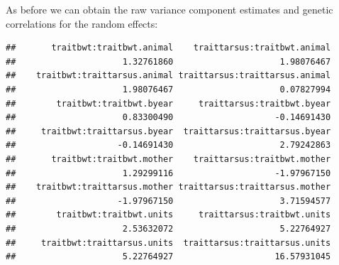 \documentclass[
  12pt,
]{book}
\newenvironment{Shaded}{\begin{snugshade}}{\end{snugshade}}
\newcommand{\FloatTok}[1]{\textcolor[rgb]{0.00,0.00,0.81}{#1}}
\newcommand{\KeywordTok}[1]{\textcolor[rgb]{0.13,0.29,0.53}{\textbf{#1}}}
\newcommand{\NormalTok}[1]{#1}
\newcommand{\OperatorTok}[1]{\textcolor[rgb]{0.81,0.36,0.00}{\textbf{#1}}}
\newcommand{\StringTok}[1]{\textcolor[rgb]{0.31,0.60,0.02}{#1}}
\begin{document}
As before we can obtain the raw variance component estimates and genetic correlations for the random effects:

\begin{Shaded}
\end{Shaded}

\begin{verbatim}
##       traitbwt:traitbwt.animal    traittarsus:traitbwt.animal 
##                     1.32761860                     1.98076467 
##    traitbwt:traittarsus.animal traittarsus:traittarsus.animal 
##                     1.98076467                     0.07827994 
##        traitbwt:traitbwt.byear     traittarsus:traitbwt.byear 
##                     0.83300490                    -0.14691430 
##     traitbwt:traittarsus.byear  traittarsus:traittarsus.byear 
##                    -0.14691430                     2.79242863 
##       traitbwt:traitbwt.mother    traittarsus:traitbwt.mother 
##                     1.29299116                    -1.97967150 
##    traitbwt:traittarsus.mother traittarsus:traittarsus.mother 
##                    -1.97967150                     3.71594577 
##        traitbwt:traitbwt.units     traittarsus:traitbwt.units 
##                     2.53632072                     5.22764927 
##     traitbwt:traittarsus.units  traittarsus:traittarsus.units 
##                     5.22764927                    16.57931045
\end{verbatim}

\begin{Shaded}
\end{Shaded}
\end{document}
